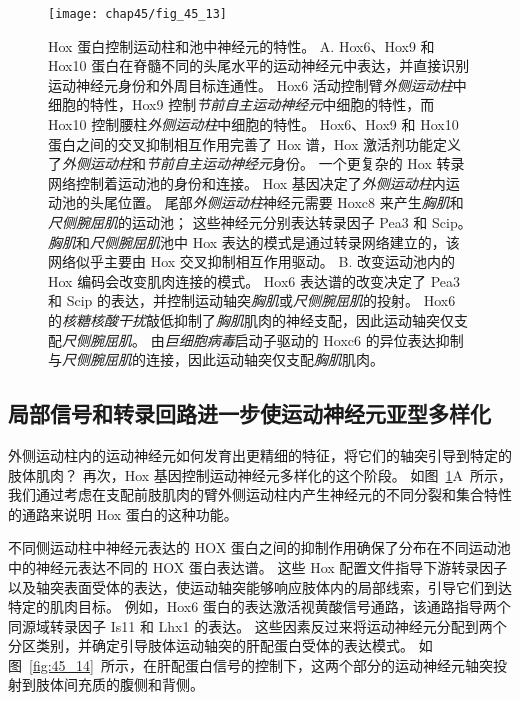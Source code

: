 \begin{figure}[htbp]
	\centering
	\texttt{[image: chap45/fig\_45\_13]}
	\caption{Hox 蛋白控制运动柱和池中神经元的特性\cite{dasen2005hox}。
		A. Hox6、Hox9 和 Hox10 蛋白在脊髓不同的头尾水平的运动神经元中表达，并直接识别运动神经元身份和外周目标连通性。
		Hox6 活动控制臂\textit{外侧运动柱}中细胞的特性，Hox9 控制\textit{节前自主运动神经元}中细胞的特性，而 Hox10 控制腰柱\textit{外侧运动柱}中细胞的特性。
		Hox6、Hox9 和 Hox10 蛋白之间的交叉抑制相互作用完善了 Hox 谱，Hox 激活剂功能定义了\textit{外侧运动柱}和\textit{节前自主运动神经元}身份。
		一个更复杂的 Hox 转录网络控制着运动池的身份和连接。
		Hox 基因决定了\textit{外侧运动柱}内运动池的头尾位置。
		尾部\textit{外侧运动柱}神经元需要 Hoxc8 来产生\textit{胸肌}和\textit{尺侧腕屈肌}的运动池；
		这些神经元分别表达转录因子 Pea3 和 Scip。
		\textit{胸肌}和\textit{尺侧腕屈肌}池中 Hox 表达的模式是通过转录网络建立的，该网络似乎主要由 Hox 交叉抑制相互作用驱动。
		B. 改变运动池内的 Hox 编码会改变肌肉连接的模式。
		Hox6 表达谱的改变决定了 Pea3 和 Scip 的表达，并控制运动轴突\textit{胸肌}或\textit{尺侧腕屈肌}的投射。
		Hox6 的\textit{核糖核酸干扰}敲低抑制了\textit{胸肌}肌肉的神经支配，因此运动轴突仅支配\textit{尺侧腕屈肌}。
		由\textit{巨细胞病毒}启动子驱动的 Hoxc6 的异位表达抑制与\textit{尺侧腕屈肌}的连接，因此运动轴突仅支配\textit{胸肌}肌肉。}
	\label{fig:45_13}
\end{figure}



\subsection{局部信号和转录回路进一步使运动神经元亚型多样化}

外侧运动柱内的运动神经元如何发育出更精细的特征，将它们的轴突引导到特定的肢体肌肉？
再次，Hox 基因控制运动神经元多样化的这个阶段。
如图~\ref{fig:45_13}A~所示，我们通过考虑在支配前肢肌肉的臂外侧运动柱内产生神经元的不同分裂和集合特性的通路来说明 Hox 蛋白的这种功能。


不同侧运动柱中神经元表达的 HOX 蛋白之间的抑制作用确保了分布在不同运动池中的神经元表达不同的 HOX 蛋白表达谱。
这些 Hox 配置文件指导下游转录因子以及轴突表面受体的表达，使运动轴突能够响应肢体内的局部线索，引导它们到达特定的肌肉目标。
例如，Hox6 蛋白的表达激活视黄酸信号通路，该通路指导两个同源域转录因子 Is11 和 Lhx1 的表达。
这些因素反过来将运动神经元分配到两个分区类别，并确定引导肢体运动轴突的肝配蛋白受体的表达模式。
如图~\ref{fig:45_14}~所示，在肝配蛋白信号的控制下，这两个部分的运动神经元轴突投射到肢体间充质的腹侧和背侧。


